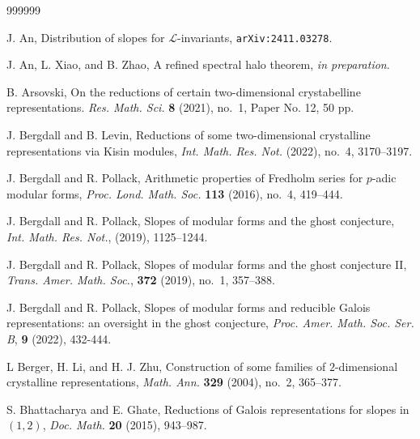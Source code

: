 \documentclass[12pt]{amsart}
\theoremstyle{definition}
\numberwithin{equation}{subsection}
\def\calL{\mathcal{L}}
\DeclareMathOperator{\GL}{GL}
\begin{document}
\begin{thebibliography}{999999}

J. An, Distribution of slopes for $\calL$-invariants, {\tt arXiv:2411.03278}.

J. An, L. Xiao, and B. Zhao, A refined spectral halo theorem, {\it in preparation}.



B. Arsovski,  On the reductions of certain two-dimensional crystabelline representations. {\it Res. Math. Sci.} {\bf 8} (2021), no.~1, Paper No. 12, 50 pp.

J. Bergdall and B. Levin,
Reductions of some two-dimensional crystalline representations via Kisin modules, {\it Int. Math. Res. Not.} (2022), no.~4, 3170--3197.

J. Bergdall and R. Pollack,
Arithmetic properties of Fredholm series for $p$-adic modular forms, {\it Proc. Lond. Math. Soc.} {\bf 113} (2016), no.~4, 419--444.

J. Bergdall and R. Pollack, Slopes of modular forms and the ghost
conjecture, {\it Int. Math. Res. Not.}, (2019), 1125--1244.


J. Bergdall and R. Pollack, Slopes of modular forms and the ghost conjecture II, {\it Trans. Amer. Math. Soc.}, {\bf 372} (2019), no.~1, 357--388.

J. Bergdall and R. Pollack, Slopes of modular forms and reducible Galois representations: an oversight in the ghost conjecture, {\it Proc. Amer. Math. Soc. Ser. B}, {\bf 9} (2022), 432-444.



L Berger, H. Li, and H. J. Zhu, Construction of some families of $2$-dimensional crystalline representations, {\it Math. Ann.} {\bf 329} (2004), no.~2, 365--377.

S. Bhattacharya and E. Ghate, 
Reductions of Galois representations for slopes in $(1,2) $, {\it Doc. Math.} {\bf20} (2015), 943--987.


\end{thebibliography}
\end{document}
